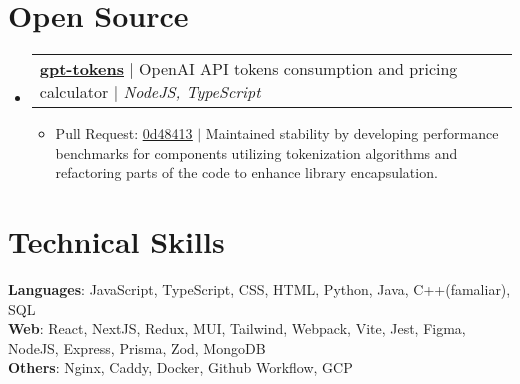 \documentclass[letterpaper,11pt]{article}
\makeatletter
\newcommand{\resumeItem}[1]{
  \item\small{
    {#1 \vspace{-2pt}}
  }
}
\newcommand{\resumeProjectHeading}[2]{
    \item
    \begin{tabular*}{0.97\textwidth}{l@{\extracolsep{\fill}}r}
      \small#1 & #2 \\
    \end{tabular*}\vspace{-7pt}
}
\newcommand{\resumeSubHeadingListStart}{\begin{itemize}[leftmargin=0.15in, label={}]}
\newcommand{\resumeSubHeadingListEnd}{\end{itemize}}
\newcommand{\resumeItemListStart}{\begin{itemize}}
\newcommand{\resumeItemListEnd}{\end{itemize}\vspace{-5pt}}
\makeatother
\begin{document}
\section{Open Source}
  \resumeSubHeadingListStart
    \resumeProjectHeading
      {\textbf{\underline{\href{https://www.npmjs.com/package/gpt-tokens}{gpt-tokens}}} $|$ OpenAI API tokens consumption and pricing calculator $|$ \emph  {NodeJS, TypeScript}}{}
      \resumeItemListStart
        \resumeItem{\faGithub \thinspace \thinspace Pull Request: \underline{\href{https://github.com/Cainier/gpt-tokens/pull/50}{0d48413}} $|$ Maintained stability by developing performance benchmarks for components utilizing tokenization algorithms and refactoring parts of the code to enhance library encapsulation.}
      \resumeItemListEnd
  \resumeSubHeadingListEnd

\section{Technical Skills}
 \begin{itemize}[leftmargin=0.15in, label={}]
    \small{\item{
      \textbf{Languages}{: JavaScript, TypeScript, CSS, HTML, Python, Java, C++(famaliar), SQL} \\
      \textbf{Web}{: React, NextJS, Redux, MUI, Tailwind, Webpack, Vite, Jest, Figma, NodeJS, Express, Prisma, Zod, MongoDB} \\
      \textbf{Others}{: Nginx, Caddy, Docker, Github Workflow, GCP } \\
     }}
 \end{itemize}


\end{document}

